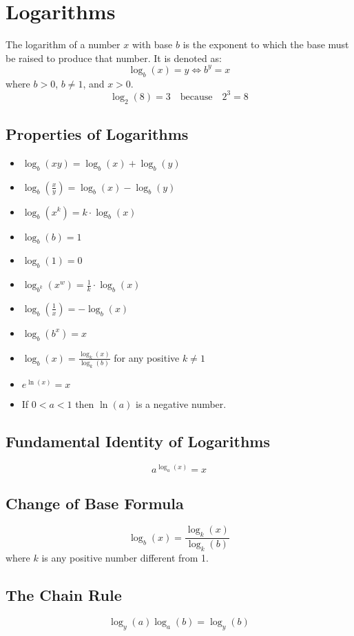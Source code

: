 \section{Logarithms}

The logarithm of a number \(x\) with base \(b\) is the exponent to which the base must be raised to produce that number. It is denoted as:
  \[
    \log_b(x) = y \iff b^y = x
  \]
where \(b > 0\), \(b \neq 1\), and \(x > 0\).
  \[
    \log_2(8) = 3 \quad \text{because} \quad 2^3 = 8
  \]


\subsection{Properties of Logarithms}
\begin{itemize}[label=\(-\)]
  \item \(\log_b(xy) = \log_b(x) + \log_b(y)\)
  \item \(\log_b\left(\frac{x}{y}\right) = \log_b(x) - \log_b(y)\)
  \item \(\log_b(x^k) = k \cdot \log_b(x)\)
  \item \(\log_b(b) = 1\)
  \item \(\log_b(1) = 0\)
  \item \(\log_{b^k}(x^w) = \frac{1}{k} \cdot \log_b(x)\)
  \item \(\log_b\left(\frac{1}{x}\right) = -\log_b(x)\)
  \item \(\log_b(b^x) = x\)
  \item \(\log_b(x) = \frac{\log_k(x)}{\log_k(b)}\) for any positive \(k \neq 1\)
  \item \(e^{\ln(x)} = x\)
  \item If \(0 < a < 1\) then \(\ln(a)\) is a negative number. 
\end{itemize}

\subsection{Fundamental Identity of Logarithms}
\[
a^{\log_a(x)} = x
\]

\subsection{Change of Base Formula}
\[
\log_b(x) = \frac{\log_k(x)}{\log_k(b)}
\]
where \(k\) is any positive number different from 1.

\subsection{The Chain Rule}
\[
    \log_y(a) \log_a(b) = \log_y(b)
\]

